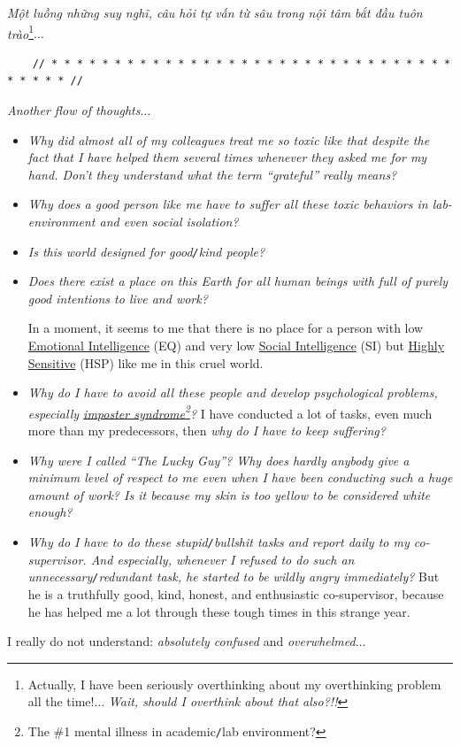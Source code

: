 \documentclass[12pt]{article}
\begin{document}
{\it Một luồng những suy nghĩ, câu hỏi tự vấn từ sâu trong nội tâm bắt đầu tuôn trào}\footnote{Actually, I have been seriously overthinking about my overthinking problem all the time!$\ldots$ {\it Wait, should I overthink about that also?!!}}$\ldots$

\begin{verbatim}
	// * * * * * * * * * * * * * * * * * * * * * * * * * * * * * * * * * * * * * //
\end{verbatim}

\noindent
{} {\it Another flow of thoughts}$\ldots$
\begin{itemize}
	\setlength\itemsep{0em}
	\item {\it Why did almost all of my colleagues treat me so toxic like that despite the fact that I have helped them several times whenever they asked me for my hand. Don't they understand what the term ``grateful'' really means?}
	\item {\it Why does a good person like me have to suffer all these toxic behaviors in lab-environment and even social isolation?}
	\item {\it Is this world designed for good{\tt/}kind people?}
	\item {\it Does there exist a place on this Earth for all human beings with full of purely good intentions to live and work?}
	
	In a moment, it seems to me that there is no place for a person with low \href{https://en.wikipedia.org/wiki/Emotional_intelligence}{Emotional Intelligence} (EQ) and very low \href{https://en.wikipedia.org/wiki/Social_intelligence}{Social Intelligence} (SI) but \href{https://hsperson.com/}{Highly Sensitive} (HSP) like me in this cruel world.    
	\item {\it Why do I have to avoid all these people and develop psychological problems, especially \href{https://en.wikipedia.org/wiki/Impostor_syndrome}{imposter syndrome}\footnote{The \#1 mental illness in academic{\tt/}lab environment?}?} I have conducted a lot of tasks, even much more than my predecessors, then {\it why do I have to keep suffering?}
	\item {\it Why were I called ``The Lucky Guy''? Why does hardly anybody give a minimum level of respect to me even when I have been conducting such a huge amount of work? Is it because my skin is too yellow to be considered white enough?}
	\item {\it Why do I have to do these stupid{\tt/}bullshit tasks and report daily to my co-supervisor. And especially, whenever I refused to do such an unnecessary{\tt/}redundant task, he started to be wildly angry immediately?} But he is a truthfully good, kind, honest, and enthusiastic co-supervisor, because he has helped me a lot through these tough times in this strange year.
\end{itemize}
I really do not understand: {\it absolutely confused} and {\it overwhelmed}$\ldots$
\end{document}
